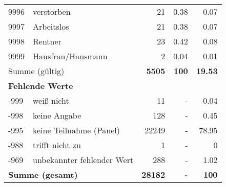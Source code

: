 \begin{longtable}{lXrrr}
        9996 & \multicolumn{1}{X}{verstorben} & %
          \num{21} &
          \num[round-mode=places,round-precision=2]{0.38} &
          \num[round-mode=places,round-precision=2]{0.07} \\

        9997 & \multicolumn{1}{X}{Arbeitslos} & %
          \num{21} &
          \num[round-mode=places,round-precision=2]{0.38} &
          \num[round-mode=places,round-precision=2]{0.07} \\

        9998 & \multicolumn{1}{X}{Rentner} & %
          \num{23} &
          \num[round-mode=places,round-precision=2]{0.42} &
          \num[round-mode=places,round-precision=2]{0.08} \\

        9999 & \multicolumn{1}{X}{Hausfrau/Hausmann} & %
          \num{2} &
          \num[round-mode=places,round-precision=2]{0.04} &
          \num[round-mode=places,round-precision=2]{0.01} \\

     \midrule
     \multicolumn{2}{l}{Summe (gültig)} &
       \textbf{\num{5505}} &
     \textbf{100} &
       \textbf{\num[round-mode=places,round-precision=2]{19.53}} \\
     \multicolumn{5}{l}{\textbf{Fehlende Werte}}\\
       -999 &
       weiß nicht &
         \num{11} &
        - &
         \num[round-mode=places,round-precision=2]{0.04} \\
       -998 &
       keine Angabe &
         \num{128} &
        - &
         \num[round-mode=places,round-precision=2]{0.45} \\
       -995 &
       keine Teilnahme (Panel) &
         \num{22249} &
        - &
         \num[round-mode=places,round-precision=2]{78.95} \\
       -988 &
       trifft nicht zu &
         \num{1} &
        - &
         \num[round-mode=places,round-precision=2]{0} \\
       -969 &
       unbekannter fehlender Wert &
         \num{288} &
        - &
         \num[round-mode=places,round-precision=2]{1.02} \\
     \midrule
     \multicolumn{2}{l}{\textbf{Summe (gesamt)}} &
          \textbf{\num{28182}} &
        \textbf{-} &
        \textbf{100} \\
     \bottomrule
     \end{longtable}
     
